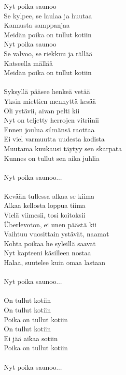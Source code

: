 
Nyt poika saunoo \\
Se kylpee, se laulaa ja huutaa \\
Kannusta samppanjaa \\
Meidän poika on tullut kotiin \\
Nyt poika saunoo \\
Se valvoo, se riekkuu ja rällää \\
Katseella mällää \\
Meidän poika on tullut kotiin \\
\hspace{10mm} \\
Syksyllä pääsee henkeä vetää \\
Yksin miettien mennyttä kesää \\
Oli ystävii, aivan pelti kii \\
Nyt on teljetty herrojen vitriinii \\
Ennen joulua silmänsä raottaa \\
Ei viel varmuutta uudesta kodista \\
Muutama kuukausi täytyy sen skarpata \\
Kunnes on tullut sen aika juhlia \\
\hspace{10mm} \\
Nyt poika saunoo... \\
\hspace{10mm} \\
Kevään tullessa alkaa se kiima \\
Alkaa kellosta loppua tiima \\
Vielä viimesii, tosi koitoksii \\
Überlevoton, ei unen päästä kii \\
Vaihtuu vuosittain ystävät, naamat \\
Kohta poikaa he syleillä saavat \\
Nyt kapteeni käsilleen nostaa \\
Halaa, suutelee kuin omaa lastaan \\
\hspace{10mm} \\
Nyt poika saunoo... \\
\hspace{10mm} \\
On tullut kotiin \\
On tullut kotiin \\
Poika on tullut kotiin \\
On tullut kotiin \\
Ei jää aikaa sotiin \\
Poika on tullut kotiin \\
\hspace{10mm} \\
Nyt poika saunoo... \\
